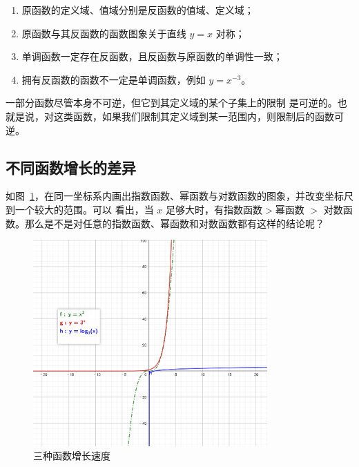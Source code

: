 \documentclass[a4paper,openany]{ctexbook}
\begin{document}
\begin{enumerate}
    \item 原函数的定义域、值域分别是反函数的值域、定义域；
    \item 原函数与其反函数的函数图象关于直线 \(y=x\) 对称；
    \item 单调函数一定存在反函数，且反函数与原函数的单调性一致；
    \item 拥有反函数的函数不一定是单调函数，例如 \(y=x^{-3}\)。
\end{enumerate}

一部分函数尽管本身不可逆，但它到其定义域的某个子集上的限制%
是可逆的。也就是说，对这类函数，如果我们限制其定义域到某一范围内，则限制后的函数可逆。

\subsection{不同函数增长的差异}

如图~\ref{fgr:sjvshjuuzgvhsudu}，在同一坐标系内画出指数函数、幂函数与对数函数的图象，并改变坐标尺到一个较大的范围。可以
看出，当 \(x\) 足够大时，有指数函数\(>\)幂函数 \(>\) 对数函数。那么是不是对任意的指数函数、幂函数和对数函数都有这样的结论呢？

\begin{figure}
    \centering
    \includegraphics[width=0.8\textwidth]{image33.png}
    \caption{三种函数增长速度}\label{fgr:sjvshjuuzgvhsudu}
\end{figure}
\end{document}
